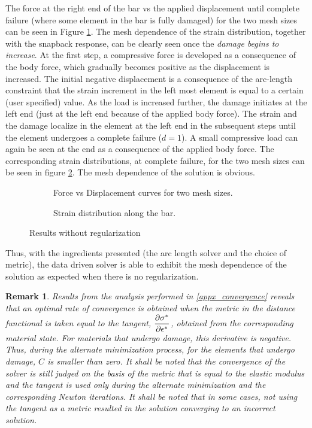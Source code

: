 \documentclass[10pt]{elsarticle}
\newtheorem*{remark}{Remark}
\begin{document}
The force at the right end of the bar vs the applied displacement until complete failure (where some element in the bar is fully damaged) for the two mesh sizes can be seen in Figure \ref{force_disp_local}. The mesh dependence of the strain distribution, together with the snapback response, can be clearly seen once the \textit{damage begins to increase}. At the first step, a compressive force is developed as a consequence of the body force, which gradually becomes positive as the displacement is increased. The initial negative displacement is a consequence of the arc-length constraint that the strain increment in the left most element is equal to a certain (user specified) value. As the load is increased further, the damage initiates at the left end (just at the left end because of the applied body force). The strain and the damage localize in the element at the left end in the subsequent steps until the element undergoes a complete failure ($d=1$). A small compressive load can again be seen at the end as a consequence of the applied body force. The corresponding strain distributions, at complete failure, for the two mesh sizes can be seen in figure \ref{strain_dist_local}. The mesh dependence of the solution is obvious.

\begin{figure}[ht]
	\begin{subfigure}{0.45\textwidth}
		\centering
		
		\caption{Force vs Displacement curves for two mesh sizes.}
		\label{force_disp_local}
	\end{subfigure}
	\hfill
	\begin{subfigure}{0.45\textwidth}
		\centering
		
		\caption{Strain distribution along the bar.}
		\label{strain_dist_local}
	\end{subfigure}
	\caption{Results without regularization}
	\label{fig:Results_without_regularization}
\end{figure}



Thus, with the ingredients presented (the arc length solver and the choice of metric), the data driven solver is able to exhibit the mesh dependence of the solution as expected when there is no regularization.

\begin{remark}
	Results from the analysis performed in \ref{appx_convergence} reveals that an optimal rate of convergence is obtained when the metric in the distance functional is taken equal to the tangent, ${\dfrac{\partial \sigma^*}{\partial \epsilon^*}}$, obtained from the corresponding material state. For materials that undergo damage, this derivative is negative. Thus, during the alternate minimization process, for the elements that undergo damage, $C$ is smaller than zero. It shall be noted that the convergence of the solver is still judged on the basis of the metric that is equal to the elastic modulus and the tangent is used only during the alternate minimization and the corresponding Newton iterations. It shall be noted that in some cases, not using the tangent as a metric resulted in the solution converging to an \textit{incorrect} solution.
\end{remark}
\end{document}
